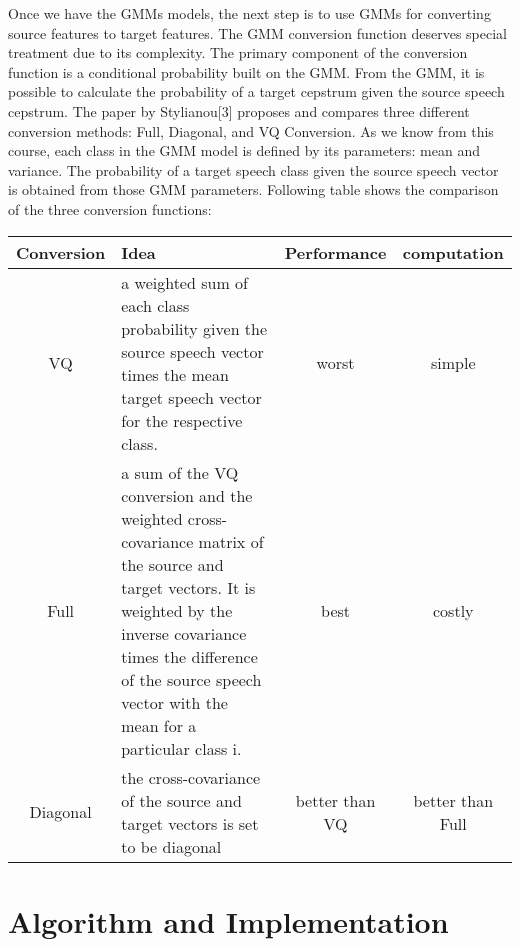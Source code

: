 \documentclass{article}
\begin{document}
Once we have the GMMs models, the next step is to use GMMs for converting source features to target features. The GMM conversion function deserves special treatment due to its complexity. The primary component of the conversion function is a conditional probability built on the GMM. From the GMM, it is possible to calculate the probability of a target cepstrum given the source speech cepstrum. The paper by Stylianou[3] proposes and compares three different conversion methods: Full, Diagonal, and VQ Conversion. As we know from this course, each class in the GMM model is defined by its parameters: mean and variance. The probability of a target speech class given the source speech vector is obtained from those GMM parameters. Following table shows the comparison of the three conversion functions:

\begin{center}
    \begin{tabular}{ | c | p{6.5cm}  | c | c |}
    \hline
    Conversion & Idea & Performance & computation\\ \hline
    VQ & a weighted sum of each class probability given the source speech vector times the mean target speech vector for the respective class. & worst & simple\\ \hline
    Full & a sum of the VQ conversion and the weighted cross-covariance matrix of the source and target vectors. It is weighted by the inverse covariance times the difference of the source speech vector with the mean for a particular class i. & best & costly\\ \hline
    Diagonal & the cross-covariance of the source and target vectors is set to be diagonal & better than VQ & better than Full\\ \hline
    \end{tabular}
\end{center}   

\section{Algorithm and Implementation}
\end{document}
